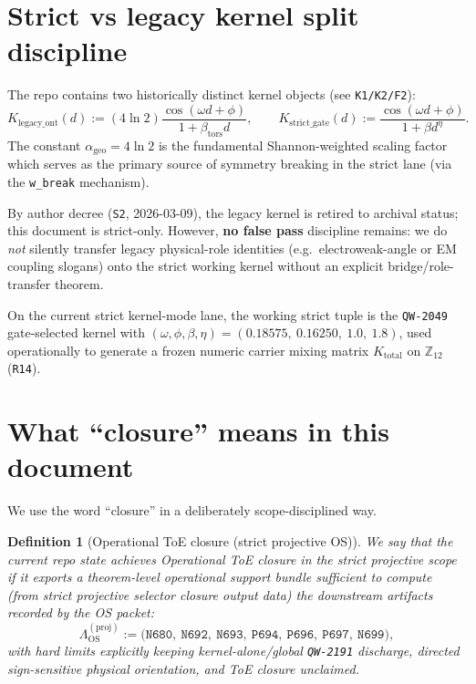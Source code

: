 \documentclass[11pt,a4paper]{article}
\newtheorem{definition}{Definition}[section]
\begin{document}
\section{Strict vs legacy kernel split discipline}

The repo contains two historically distinct kernel objects (see \texttt{K1/K2/F2}):
\begin{equation}
K_{\mathrm{legacy\_ont}}(d)
:=
(4\ln 2)\frac{\cos(\omega d+\phi)}{1+\beta_{\mathrm{tors}}d},
\qquad
K_{\mathrm{strict\_gate}}(d)
:=
\frac{\cos(\omega d+\phi)}{1+\beta d^{\eta}}.
\end{equation}
The constant $\alpha_{\mathrm{geo}} = 4\ln 2$ is the fundamental Shannon-weighted scaling factor which serves as the primary source of symmetry breaking in the strict lane (via the \texttt{w\_break} mechanism).

By author decree (\texttt{S2}, 2026-03-09), the legacy kernel is retired to archival status; this document is strict-only.
However, \textbf{no false pass} discipline remains:
we do \emph{not} silently transfer legacy physical-role identities (e.g.\ electroweak-angle or EM coupling slogans) onto the strict working kernel without an explicit bridge/role-transfer theorem.

On the current strict kernel-mode lane, the working strict tuple is the \texttt{QW-2049} gate-selected kernel with
$(\omega,\phi,\beta,\eta)=(0.18575,\ 0.16250,\ 1.0,\ 1.8)$, used operationally to generate a frozen numeric carrier mixing matrix $K_{\mathrm{total}}$ on $\mathbb{Z}_{12}$ (\texttt{R14}).
\section{What “closure” means in this document}

We use the word “closure” in a deliberately scope-disciplined way.

\begin{definition}[Operational ToE closure (strict projective OS)]
We say that the current repo state achieves \emph{Operational ToE closure} in the strict \emph{projective} scope if it exports a theorem-level
operational support bundle sufficient to compute (from strict projective selector closure output data) the downstream artifacts recorded by the OS packet:
\[
\Lambda_{\mathrm{OS}}^{(\mathrm{proj})} :=
\bigl(
\texttt{N680},\ \texttt{N692},\ \texttt{N693},\ \texttt{P694},\ \texttt{P696},\ \texttt{P697},\ \texttt{N699}
\bigr),
\]
with hard limits explicitly keeping \emph{kernel-alone/global} \texttt{QW-2191} discharge, directed sign-sensitive physical orientation, and ToE closure unclaimed.
\end{definition}
\end{document}
